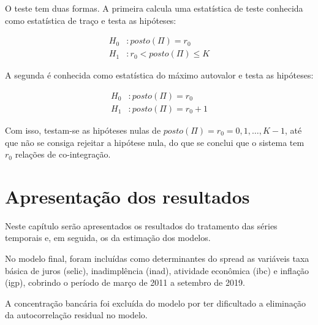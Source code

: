 \documentclass[a4paper,
               article,
               12pt,
               openany,
               oneside,
               english,
               brazil]{abntex2}
\numberwithin{equation}{section}
\begin{document}
   O teste tem duas formas. A primeira calcula uma estatística de teste conhecida como estatística de traço e testa as hipóteses:

   \begin{equation}
       \label{trace}
       \begin{aligned}
           H_0&: posto(\Pi) = r_0 \\
           H_1&: r_0 < posto(\Pi) \leq K
       \end{aligned}
   \end{equation}

   A segunda é conhecida como estatística do máximo autovalor e testa as hipóteses:

   \begin{equation}
       \label{maxeig}
       \begin{aligned}
           H_0&: posto(\Pi) = r_0 \\
           H_1&: posto(\Pi) = r_0 + 1
       \end{aligned}
   \end{equation}

   Com isso, testam-se as hipóteses nulas de $ posto(\Pi) = r_0 = 0, 1, \dots, K-1 $, até que não se consiga rejeitar a hipótese nula, do que se conclui que o sistema tem $ r_0 $ relações de co-integração.

   \section{Apresentação dos resultados}

   Neste capítulo serão apresentados os resultados do tratamento das séries temporais e, em seguida, os da estimação dos modelos. 
   

   No modelo final, foram incluídas como determinantes do spread as variáveis taxa básica de juros (selic), inadimplência (inad), atividade econômica (ibc) e inflação (igp), cobrindo o período de março de 2011 a setembro de 2019. 
   
   
   A concentração bancária foi excluída do modelo por ter dificultado a eliminação da autocorrelação residual no modelo. 
\end{document}
